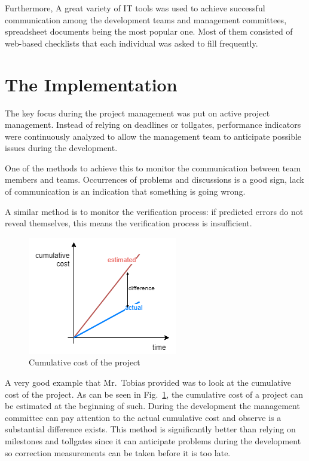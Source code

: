 \documentclass[journal]{IEEEtran}
\begin{document}
Furthermore, A great variety of IT tools was used to achieve successful communication among the development teams and management committees, spreadsheet documents being the most popular one. Most of them consisted of web-based checklists that each individual was asked to fill frequently.

\section{The Implementation}
The key focus during the project management was put on active project management. Instead of relying on deadlines or tollgates, performance indicators were continuously analyzed to allow the management team to anticipate possible issues during the development. 

One of the methods to achieve this to monitor the communication between team members and teams. Occurrences of problems and discussions is a good sign, lack of communication is an indication that something is going wrong. 

A similar method is to monitor the verification process: if predicted errors do not reveal themselves, this means the verification process is insufficient. 

\begin{figure}[h]
    \centering
    \includegraphics[width=0.8\linewidth]{cost.png}
    \caption{Cumulative cost of the project}
    \label{fig:cost}
\end{figure}

A very good example that Mr.~Tobias provided was to look at the cumulative cost of the project. As can be seen in Fig.~\ref{fig:cost}, the cumulative cost of a project can be estimated at the beginning of such. During the development the management committee can pay attention to the actual cumulative cost and observe is a substantial difference exists. This method is significantly better than relying on milestones and tollgates since it can anticipate problems during the development so correction measurements can be taken before it is too late.
\end{document}
